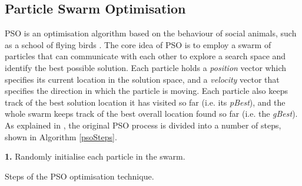 \documentclass{llncs}
\begin{document}
\subsection{Particle Swarm Optimisation}

PSO is an optimisation algorithm based on the behaviour of social animals, such as a school of flying birds \cite{shi1998modified}. The core idea of PSO is to employ a swarm of particles that can communicate with each other to explore a search space and identify the best possible solution. Each particle holds a \textit{position} vector which specifies its current location in the solution space, and a \textit {velocity} vector that specifies the direction in which the particle is moving. Each particle also keeps track of the best solution location it has visited so far (i.e. its \textit{pBest}), and the whole swarm keeps track of the best overall location found so far (i.e. the \textit{gBest}). As explained in \cite{eberhart2001particle}, the original PSO process is divided into a number of steps, shown in Algorithm \ref{psoSteps}.

\begin{algorithm}[!htb]
 \setlength{}
 \let\oldnl\nl%
\newcommand{\nonl}{\renewcommand{\nl}{\let\nl\oldnl}}
 \LinesNumbered
	\textbf{1.} Randomly initialise each particle in the swarm.\\
	\nonl {}
	
 \caption{Steps of the PSO optimisation technique.}
\label{psoSteps}
\end{algorithm}
\end{document}
